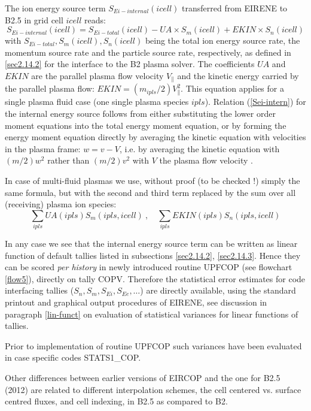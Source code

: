 The ion energy source term $S_{Ei-internal}(icell)$ transferred from EIRENE to B2.5 in grid cell $icell$ reads:
\begin{equation}\label{Sei-intern}
S_{Ei-internal}(icell)= S_{Ei-total}(icell) - UA \times S_m(icell) + EKIN \times S_n(icell)
\end{equation}
with $S_{Ei-total} , S_m(icell) , S_n(icell)$ being the total ion energy source rate, the momentum source rate and the particle source rate,
respectively, as defined in \ref{sec2.14.2} for the interface to the B2 plasma solver. The coefficients
$UA$ and $EKIN$ are the parallel plasma flow velocity $V_\parallel$ and the kinetic energy carried by the parallel
plasma flow: $EKIN = (m_{ipls}/2) V_\parallel^2$.
This equation applies for a single plasma fluid case (one single plasma species $ipls$).
Relation (\ref{Sei-intern}) for the internal energy source follows from either substituting the lower order moment equations into the total energy moment equation,
or by forming the energy moment equation directly by averaging the kinetic equation with velocities in the plasma frame:
$w = v - V$, i.e. by averaging the kinetic equation with $(m/2) w^2$ rather than $(m/2) v^2$ with $V$ the plasma flow velocity \cite{kn:Mueller}.

In case of multi-fluid plasmas we use, without proof  (to be checked !) simply the same formula,
but with the second and third term replaced by the sum over all (receiving) plasma ion species:
\begin{equation}
\sum_{ipls} UA(ipls) S_m(ipls,icell) \ , \quad \sum_{ipls} EKIN(ipls) S_n(ipls,icell)
\end{equation}


In any case we see that the internal energy source term can be written as linear function of default tallies listed in subsections \ref{sec2.14.2}, \ref{sec2.14.3}.
Hence they can be scored \emph{per history} in newly introduced routine UPFCOP (see flowchart \ref{flow5}), directly on tally COPV.
Therefore the statistical error estimates for code interfacing tallies ($S_n, S_m, S_{Ei}, S_{Ee}, \dots$) are directly
available, using the standard printout and graphical output procedures of EIRENE, see discussion in paragraph \ref{lin-funct} on evaluation of statistical variances
for linear functions of tallies.

Prior to implementation of routine
UPFCOP such variances have been evaluated in case specific codes STATS1\_COP.

Other differences between earlier versions of EIRCOP and the one for B2.5 (2012) are related to
different interpolation schemes, the cell centered vs. surface centred fluxes, and cell indexing, in B2.5 as compared to B2.

